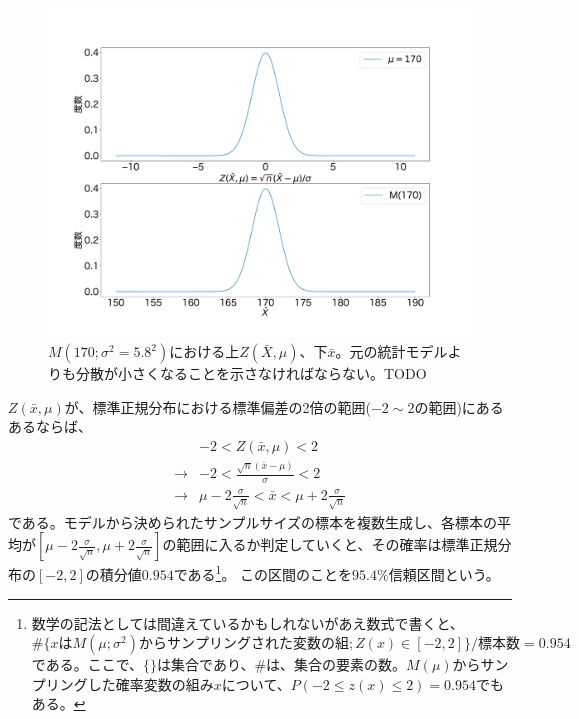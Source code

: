 \begin{figure}
    \begin{center}
        \includegraphics[width=15cm]{./image/03_/normal_Z_frequency.pdf}
        \caption{$M(170;\sigma^2=5.8^2)$における上$Z(\bar{X},\mu)$、下$\bar{x}$。元の統計モデルよりも分散が小さくなることを示さなければならない。TODO}
        \label{fig:cm_standard_normal_distribution}
    \end{center}
\end{figure}
\fi


$Z(\bar{x},\mu)$が、標準正規分布における標準偏差の2倍の範囲($-2 \sim 2$の範囲)にあるあるならば、
\begin{eqnarray*}
    & -2 < Z(\bar{x},\mu)<2 \\
\rightarrow & -2 < \frac{\sqrt{n}(\bar{x}-\mu)}{\sigma}  <2 \\
\rightarrow & \mu - 2 \frac{\sigma}{\sqrt{n}} < \bar{x} < \mu + 2\frac{\sigma}{\sqrt{n}}
\end{eqnarray*}
である。モデルから決められたサンプルサイズの標本を複数生成し、各標本の平均が$[\mu - 2 \frac{\sigma}{\sqrt{n}} ,\mu + 2\frac{\sigma}{\sqrt{n}}]$の範囲に入るか判定していくと、その確率は標準正規分布の$[-2,2]$の積分値$0.954$である\footnote{数学の記法としては間違えているかもしれないがあえ数式で書くと、$\#\{xはM(\mu;\sigma^2)からサンプリングされた変数の組; Z(x)\in[-2,2]\}/標本数=0.954$である。ここで、$\{\}$は集合であり、$\#{}$は、集合の要素の数。$M(\mu)$からサンプリングした確率変数の組み$x$について、$P(-2\leq z(x)\leq 2)=0.954$でもある。}。
この区間のことを$95.4\%$信頼区間という。

